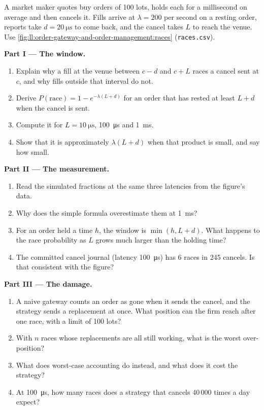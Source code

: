 \begin{problem}\label{pb:ll:order-gateway-and-order-management:1}
A market maker quotes buy orders of 100 lots, holds each for a millisecond on average and then cancels it. Fills arrive at
$\lambda = 200$ per second on a resting order, reports take $d = \qty{20}{\micro\second}$ to come back, and the cancel takes
$L$ to reach the venue. Use \cref{fig:ll:order-gateway-and-order-management:races} (\texttt{races.csv}).

\medskip\noindent\textbf{Part I --- The window.}
\begin{enumerate}
\item Explain why a fill at the venue between $c - d$ and $c + L$ races a cancel sent at $c$, and why fills outside that
interval do not.
\item Derive $P(\text{race}) = 1 - e^{-\lambda(L + d)}$ for an order that has rested at least $L + d$ when the cancel is sent.
\item Compute it for $L = \qty{10}{\micro\second}$, \qty{100}{\micro\second} and \qty{1}{\milli\second}.
\item Show that it is approximately $\lambda (L + d)$ when that product is small, and say how small.
\end{enumerate}

\medskip\noindent\textbf{Part II --- The measurement.}
\begin{enumerate}[resume]
\item Read the simulated fractions at the same three latencies from the figure's data.
\item Why does the simple formula overestimate them at \qty{1}{\milli\second}?
\item For an order held a time $h$, the window is $\min(h, L + d)$. What happens to the race probability as $L$ grows much
larger than the holding time?
\item The committed cancel journal (latency \qty{100}{\micro\second}) has 6 races in 245 cancels. Is that consistent with the
figure?
\end{enumerate}

\medskip\noindent\textbf{Part III --- The damage.}
\begin{enumerate}[resume]
\item A naive gateway counts an order as gone when it sends the cancel, and the strategy sends a replacement at once. What
position can the firm reach after one race, with a limit of 100 lots?
\item With $n$ races whose replacements are all still working, what is the worst over-position?
\item What does worst-case accounting do instead, and what does it cost the strategy?
\item At \qty{100}{\micro\second}, how many races does a strategy that cancels 40\,000 times a day expect?
\end{enumerate}


\end{problem}
